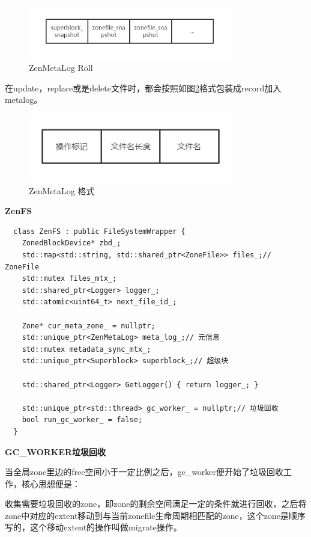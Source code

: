 \begin{figure}[htbp]
  \centering
  \includegraphics[width=0.8\textwidth]{fig/roll_metazone_init}
  \caption{ZenMetaLog Roll}
  \label{roll_metazone_init}
\end{figure}

在update，replace或是delete文件时，都会按照如图\ref{manipulate_form}格式包装成record加入metalog。

\begin{figure}[htbp]
  \centering
  \includegraphics[width=0.8\textwidth]{fig/manipulate_form}
  \caption{ZenMetaLog 格式}
  \label{manipulate_form}
\end{figure}

\textbf{ZenFS}

\begin{lstlisting}
  class ZenFS : public FileSystemWrapper {
    ZonedBlockDevice* zbd_;
    std::map<std::string, std::shared_ptr<ZoneFile>> files_;// ZoneFile
    std::mutex files_mtx_;
    std::shared_ptr<Logger> logger_;
    std::atomic<uint64_t> next_file_id_;
  
    Zone* cur_meta_zone_ = nullptr;
    std::unique_ptr<ZenMetaLog> meta_log_;// 元信息
    std::mutex metadata_sync_mtx_;
    std::unique_ptr<Superblock> superblock_;// 超级块
  
    std::shared_ptr<Logger> GetLogger() { return logger_; }
  
    std::unique_ptr<std::thread> gc_worker_ = nullptr;// 垃圾回收
    bool run_gc_worker_ = false;
  }  
\end{lstlisting}

\textbf{GC\_WORKER垃圾回收}

当全局zone里边的free空间小于一定比例之后，gc\_worker便开始了垃圾回收工作，核心思想便是：

收集需要垃圾回收的zone，即zone的剩余空间满足一定的条件就进行回收，之后将zone中对应的extent移动到与当前zonefile生命周期相匹配的zone，这个zone是顺序写的，这个移动extent的操作叫做migrate操作。

